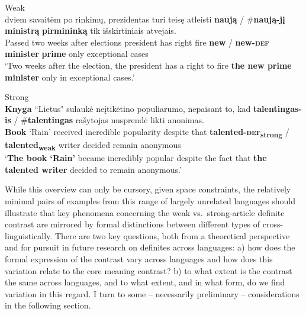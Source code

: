 \documentclass[output=paper
,modfonts
,nonflat]{langscibook}
\begin{document}
\begin{exe}
\ex\label{ex:schwarz:21} 
\begin{xlist}
\ex Weak\\ 
 {dviem} {savaitėm} {po} {rinkimų}, {prezidentas} {turi} {teisę} {atleisti} \textbf{naują} \textnormal{/} \textnormal{\#}\textbf{naują-jį} \textbf{ministrą} \textbf{pirmininką} {tik} {išskirtiniais} {atvejais}.\\
Passed two weeks after elections president has right fire \textbf{new} / \phantom{\#}\textbf{new-\textsc{def}} \textbf{minister} \textbf{prime} only exceptional cases\\
\glt `Two weeks after the election, the president has a right to fire \textbf{the new prime minister} only in exceptional cases.'

\ex Strong\\ 
\gll \textbf{Knyga} ``{Lietus}" {sulaukė} {neįtikėtino} {populiarumo}, {nepaisant} {to}, {kad} \textbf{talentingas-is} \textnormal{/} \textnormal{\#}\textbf{talentingas} {rašytojas} {nusprendė} {likti} {anonimas}.\\
\textbf{Book} `Rain' received incredible popularity despite {} that \textbf{talented-\textsc{def}\textsubscript{strong}} / \phantom{\#}\textbf{talented\textsubscript{weak}} writer decided remain anonymous\\
\trans `\textbf{The book `Rain'} became incredibly popular despite the
fact that \textbf{the talented writer} decided to remain anonymous.' 
\end{xlist}
\end{exe}

While this overview can only be cursory, given space constraints, the
relatively minimal pairs of examples from this range of largely
unrelated languages should illustrate that key phenomena concerning the weak
vs.\ strong-article definite contrast are mirrored by formal
distinctions between different types of 
cross-linguistically. There are two key questions, both from a theoretical
perspective and for pursuit in future research on definites across
languages: a) how does the formal expression of the contrast vary across
languages and how does this variation relate to the core meaning contrast?
b) to what extent is the contrast the same across languages, and
to what extent, and in what form, do we find variation in this regard. I
turn to some -- necessarily preliminary -- considerations in the
following section.
\end{document}
